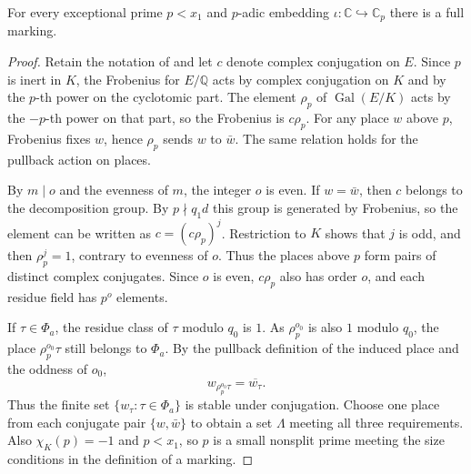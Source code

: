 \begin{lemma}
\label{lem:a-full-mark}
\emitthmsource
For every exceptional prime $p<x_1$ and $p$-adic embedding $\iota\colon\mathbb C\hookrightarrow\mathbb C_p$ there is a full marking.
\end{lemma}
\begin{proof}
Retain the notation of  and let $c$ denote complex conjugation on $E$. Since $p$ is inert in $K$, the Frobenius for $E/\mathbb Q$ acts by complex conjugation on $K$ and by the $p$-th power on the cyclotomic part. The element $\rho_p$ of $\operatorname{Gal}(E/K)$ acts by the $-p$-th power on that part, so the Frobenius is $c\rho_p$. For any place $w$ above $p$, Frobenius fixes $w$, hence $\rho_p$ sends $w$ to $\bar w$. The same relation holds for the pullback action on places.

By $m\mid o$ and the evenness of $m$, the integer $o$ is even. If $w=\bar w$, then $c$ belongs to the decomposition group. By $p\nmid q_1d$ this group is generated by Frobenius, so the element can be written as $c=(c\rho_p)^j$. Restriction to $K$ shows that $j$ is odd, and then $\rho_p^j=1$, contrary to evenness of $o$. Thus the places above $p$ form pairs of distinct complex conjugates. Since $o$ is even, $c\rho_p$ also has order $o$, and each residue field has $p^o$ elements.

If $\tau\in\Phi_a$, the residue class of $\tau$ modulo $q_0$ is $1$. As $\rho_p^{o_0}$ is also $1$ modulo $q_0$, the place $\rho_p^{o_0}\tau$ still belongs to $\Phi_a$. By the pullback definition of the induced place and the oddness of $o_0$,
\[
 w_{\rho_p^{o_0}\tau}=\overline{w_\tau}.
\]
Thus the finite set $\{w_\tau:\tau\in\Phi_a\}$ is stable under conjugation. Choose one place from each conjugate pair $\{w,\bar w\}$ to obtain a set $\Lambda$ meeting all three requirements. Also $\chi_K(p)=-1$ and $p<x_1$, so $p$ is a small nonsplit prime meeting the size conditions in the definition of a marking.
\end{proof}

